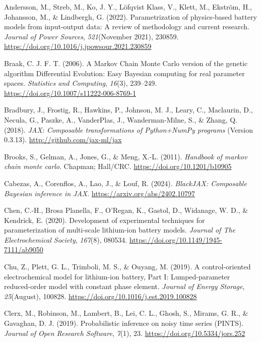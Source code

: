 \documentclass[
]{article}
\newlength{\cslhangindent}
\newenvironment{CSLReferences}[2] %
 {\begin{list}{}{%
  \setlength{\itemindent}{0pt}
  \setlength{\leftmargin}{0pt}
  \setlength{\parsep}{0pt}
  \ifodd #1
   \setlength{\leftmargin}{\cslhangindent}
   \setlength{\itemindent}{-1\cslhangindent}
  \fi
  \setlength{\itemsep}{#2\baselineskip}}}
 {\end{list}}
\begin{document}
\label{refs}
\begin{CSLReferences}{1}{0}
Andersson, M., Streb, M., Ko, J. Y., Löfqvist Klass, V., Klett, M.,
Ekström, H., Johansson, M., \& Lindbergh, G. (2022). Parametrization of
physics-based battery models from input-output data: {A} review of
methodology and current research. \emph{Journal of Power Sources},
\emph{521}(November 2021), 230859.
\url{https://doi.org/10.1016/j.jpowsour.2021.230859}

Braak, C. J. F. T. (2006). A {Markov} {Chain} {Monte} {Carlo} version of
the genetic algorithm {Differential} {Evolution}: Easy {Bayesian}
computing for real parameter spaces. \emph{Statistics and Computing},
\emph{16}(3), 239--249. \url{https://doi.org/10.1007/s11222-006-8769-1}

Bradbury, J., Frostig, R., Hawkins, P., Johnson, M. J., Leary, C.,
Maclaurin, D., Necula, G., Paszke, A., VanderPlas, J., Wanderman-Milne,
S., \& Zhang, Q. (2018). \emph{{JAX}: Composable transformations of
{P}ython+{N}um{P}y programs} (Version 0.3.13).
\url{http://github.com/jax-ml/jax}

Brooks, S., Gelman, A., Jones, G., \& Meng, X.-L. (2011). \emph{Handbook
of markov chain monte carlo}. Chapman; Hall/CRC.
\url{https://doi.org/10.1201/b10905}

Cabezas, A., Corenflos, A., Lao, J., \& Louf, R. (2024). \emph{BlackJAX:
Composable {B}ayesian inference in {JAX}}.
\url{https://arxiv.org/abs/2402.10797}

Chen, C.-H., Brosa Planella, F., O'Regan, K., Gastol, D., Widanage, W.
D., \& Kendrick, E. (2020). Development of experimental techniques for
parameterization of multi-scale lithium-ion battery models.
\emph{Journal of The Electrochemical Society}, \emph{167}(8), 080534.
\url{https://doi.org/10.1149/1945-7111/ab9050}

Chu, Z., Plett, G. L., Trimboli, M. S., \& Ouyang, M. (2019). A
control-oriented electrochemical model for lithium-ion battery, {P}art
{I}: {L}umped-parameter reduced-order model with constant phase element.
\emph{Journal of Energy Storage}, \emph{25}(August), 100828.
\url{https://doi.org/10.1016/j.est.2019.100828}

Clerx, M., Robinson, M., Lambert, B., Lei, C. L., Ghosh, S., Mirams, G.
R., \& Gavaghan, D. J. (2019). Probabilistic inference on noisy time
series ({PINTS}). \emph{Journal of Open Research Software}, \emph{7}(1),
23. \url{https://doi.org/10.5334/jors.252}


\end{CSLReferences}
\end{document}
